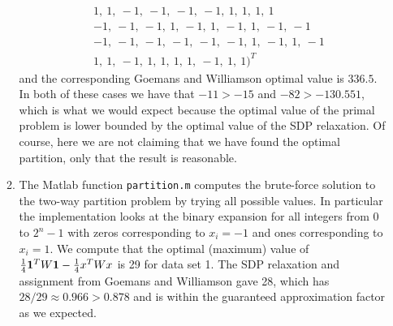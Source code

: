 \documentclass[11pt]{amsart}
\begin{document}
\begin{enumerate}
\begin{enumerate}
\begin{align*}
     & 1,\ 1,\ -1,\ -1,\ -1,\ -1,\ 1,\ 1,\ 1,\ 1\\
    & -1,\  -1,\ -1,\ 1,\ -1,\ 1,\ -1,\ 1,\ -1,\ -1\\
    & -1,\  -1,\ -1,\ -1,\ -1,\ -1,\ 1,\ -1,\ 1,\ -1\\
     & 1,\ 1,\ -1,\ 1,\ 1,\ 1,\ 1,\ -1,\ 1,\ 1)^T
\end{align*}
and the corresponding Goemans and Williamson optimal value is $336.5$.  In both of these cases we have that $-11 > -15$ and $-82 > -130.551$, which is what we would expect because the optimal value of the primal problem is lower bounded by the optimal value of the SDP relaxation.  Of course, here we are not claiming that we have found the optimal partition, only that the result is reasonable.



\item The Matlab function \texttt{partition.m} computes the brute-force solution to the two-way partition problem by trying all possible values.  In particular the implementation looks at the binary expansion for all integers from 0 to $2^n - 1$ with zeros corresponding to $x_i = -1$ and ones corresponding to $x_i = 1$.  We compute that the optimal (maximum) value of $\frac{1}{4}{\bf 1}^TW{\bf 1} - \frac{1}{4}x^TWx$ is 29 for data set 1.  The SDP relaxation and assignment from Goemans and Williamson gave 28, which has $28/29 \approx 0.966 > 0.878$ and is within the guaranteed approximation factor as we expected. 


\end{enumerate}





\end{enumerate}
\end{document}
